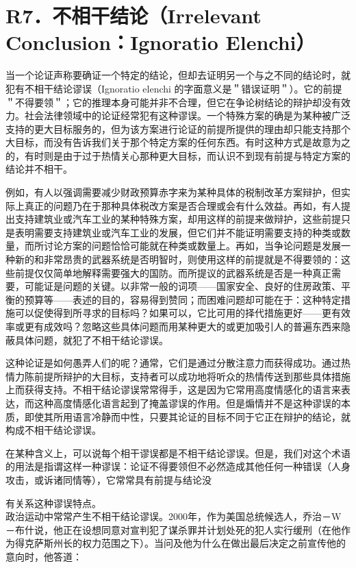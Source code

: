 \section*{R7．不相干结论（Irrelevant Conclusion：Ignoratio Elenchi）}
当一个论证声称要确证一个特定的结论，但却去证明另一个与之不同的结论时，就犯有不相干结论谬误（Ignoratio elenchi 的字面意义是＂错误证明＂）。它的前提＂不得要领＂；它的推理本身可能并非不合理，但它在争论树结论的辩护却没有效力。社会法律领域中的论证经常犯有这种谬误。一个特殊方案的确是为某种被广泛支持的更大目标服务的，但为该方案进行论证的前提所提供的理由却只能支持那个大目标，而没有告诉我们关于那个特定方案的任何东西。有时这种方式是故意为之的，有时则是由于过于热情关心那种更大目标，而认识不到现有前提与特定方案的结论并不相干。

例如，有人以强调需要减少财政预算赤字来为某种具体的税制改革方案辩护，但实际上真正的问题乃在于那种具体税改方案是否合理或会有什么效益。再如，有人提出支持建筑业或汽车工业的某种特殊方案，却用这样的前提来做辩护，这些前提只是表明需要支持建筑业或汽车工业的发展，但它们并不能证明需要支持的种类或数量，而所讨论方案的问题恰恰可能就在种类或数量上。再如，当争论问题是发展一种新的和非常昂贵的武器系统是否明智时，则使用这样的前提就是不得要领的：这些前提仅仅简单地解释需要强大的国防。而所提议的武器系统是否是一种真正需要，可能证是问题的关键。以非常一般的词项——国家安全、良好的住房政策、平衡的预算等——表述的目的，容易得到赞同；而困难问题却可能在于：这种特定措施可以促使得到所寻求的目标吗？如果可以，它比可用的择代措施更好——更有效率或更有成效吗？忽略这些具体问题而用某种更大的或更加吸引人的普遍东西来隐蔽具体问题，就犯了不相干结论谬误。

这种论证是如何愚弄人们的呢？通常，它们是通过分散注意力而获得成功。通过热情力陈前提所辩护的大目标，支持者可以成功地将听众的热情传送到那些具体措施上而获得支持。不相干结论谬误常常得手，这是因为它常用高度情感化的语言来表达，而这种高度情感化语言起到了掩盖谬误的作用。但是煽情并不是这种谬误的本质，即使其所用语言冷静而中性，只要其论证的目标不同于它正在辩护的结论，就构成不相干结论谬误。

在某种含义上，可以说每个相干谬误都是不相干结论谬误。但是，我们对这个术语的用法是指谓这样一种谬误：论证不得要领但不必然造成其他任何一种错误（人身攻击，或诉诸同情等），它常常具有前提与结论没

有关系这种谬误特点。\\
政治运动中常常产生不相干结论谬误。2000年，作为美国总统候选人，乔治－W－布什说，他正在设想同意对宣判犯了谋杀罪并计划处死的犯人实行缓刑（在他作为得克萨斯州长的权力范围之下）。当问及他为什么在做出最后决定之前宣传他的意向时，他答道：

